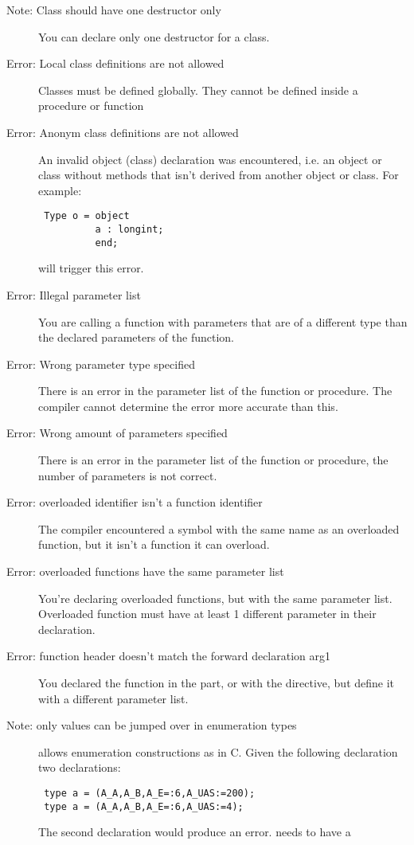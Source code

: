 \begin{description}
\item [Note: Class should have one destructor only]
 You can declare only one destructor for a class.
\item [Error: Local class definitions are not allowed]
 Classes must be defined globally. They cannot be defined inside a
 procedure or function
\item [Error: Anonym class definitions are not allowed]
 An invalid object (class) declaration was encountered, i.e. an 
 object or class without methods that isn't derived from another object or
 class. For example:
 \begin{verbatim}
 Type o = object
          a : longint;
          end;
 \end{verbatim}
 will trigger this error.
\item [Error: Illegal parameter list]
 You are calling a function with parameters that are of a different type than
 the declared parameters of the function.
\item [Error: Wrong parameter type specified]
 There is an error in the parameter list of the function or procedure.
 The compiler cannot determine the error more accurate than this.
\item [Error: Wrong amount of parameters specified]
 There is an error in the parameter list of the function or procedure,
 the number of parameters is not correct.
\item [Error: overloaded identifier isn't a function identifier]
 The compiler encountered a symbol with the same name as an overloaded
 function, but it isn't a function it can overload.
\item [Error: overloaded functions have the same parameter list]
 You're declaring overloaded functions, but with the same parameter list.
 Overloaded function must have at least 1 different parameter in their
 declaration.
\item [Error: function header doesn't match the forward declaration arg1]
 You declared the function in the  part, or with the
  directive, but define it with a different parameter list. 
\item [Note: only values can be jumped over in enumeration types]
 \fpc allows enumeration constructions as in C. Given the following
 declaration two declarations:
 \begin{verbatim}
 type a = (A_A,A_B,A_E=:6,A_UAS:=200);
 type a = (A_A,A_B,A_E=:6,A_UAS:=4);
 \end{verbatim}
 The second declaration would produce an error.  needs to have a

\end{description}
